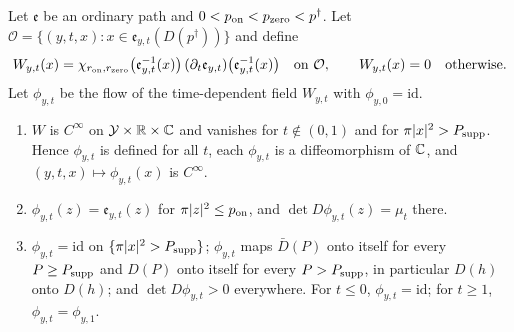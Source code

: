 \begin{lemma}\label{lem:pln-ambient-flow}
Let $\mathfrak e$ be an ordinary path and $0<p_{\rm on}<p_{\rm zero}<p^\dagger$. Let
$\mathcal O=\{(y,t,x):x\in\mathfrak e_{y,t}(D(p^\dagger))\}$ and define
\[
 W_{y,t}(x)=\chi_{r_{\rm on},r_{\rm zero}}\bigl(\mathfrak e_{y,t}^{-1}(x)\bigr)\,(\partial_t\mathfrak e_{y,t})\bigl(\mathfrak e_{y,t}^{-1}(x)\bigr)\quad\text{on }\mathcal O,
 \qquad W_{y,t}(x)=0\quad\text{otherwise}.
\]
Let $\phi_{y,t}$ be the flow of the time-dependent field $W_{y,t}$ with $\phi_{y,0}=\mathrm{id}$.
\begin{enumerate}[label=(\alph*)]
\item $W$ is $C^\infty$ on $\mathcal Y\times\mathbb{R}\times\mathbb{C}$ and vanishes for $t\notin(0,1)$ and for $\pi|x|^2>P_{\rm supp}$. Hence
 $\phi_{y,t}$ is defined for all $t$, each $\phi_{y,t}$ is a diffeomorphism of $\mathbb{C}$, and $(y,t,x)\mapsto\phi_{y,t}(x)$ is $C^\infty$.
\item $\phi_{y,t}(z)=\mathfrak e_{y,t}(z)$ for $\pi|z|^2\le p_{\rm on}$, and $\det D\phi_{y,t}(z)=\mu_t$ there.
\item $\phi_{y,t}=\mathrm{id}$ on $\{\pi|x|^2>P_{\rm supp}\}$; $\phi_{y,t}$ maps $\bar D(P)$ onto itself for every
 $P\ge P_{\rm supp}$ and $D(P)$ onto itself for every $P>P_{\rm supp}$, in particular $D(h)$ onto $D(h)$; and
 $\det D\phi_{y,t}>0$ everywhere. For $t\le0$, $\phi_{y,t}=\mathrm{id}$; for $t\ge1$, $\phi_{y,t}=\phi_{y,1}$.
\end{enumerate}
\end{lemma}


